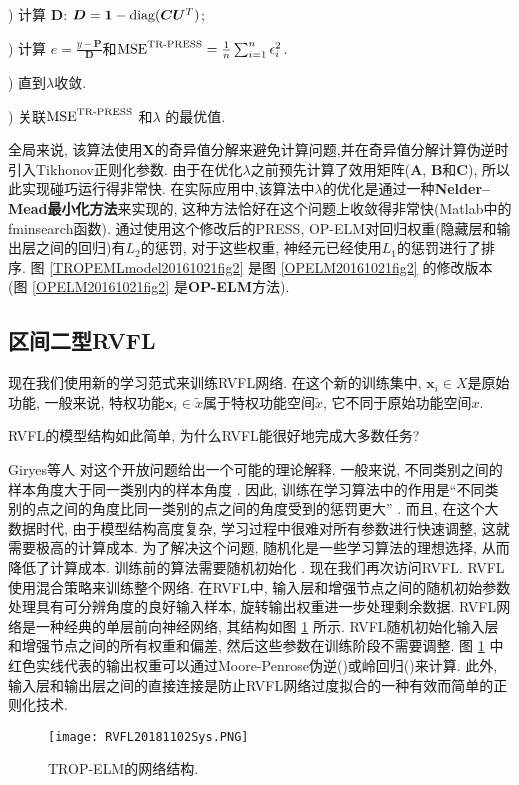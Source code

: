 ) 计算 $\bm D$: $\bm D = \bm 1-\textup{diag}(\bm C\bm U^T)$;

) 计算 $e = \frac{y-\bm P} {\bm D}$和$\textup{MSE}^{\textup{TR-PRESS}}=\frac 1 n \sum_{i=1}^n \epsilon_i^2$.

) 直到$\lambda$收敛.

) 关联$\textup{MSE}^{\textup{TR-PRESS}}$ 和$\lambda$ 的最优值.

全局来说, 该算法使用$\bm X$的奇异值分解来避免计算问题,并在奇异值分解计算伪逆时引入Tikhonov正则化参数.
由于在优化$\lambda$之前预先计算了效用矩阵($\bm A$, $\bm B$和$\bm C$), 所以此实现碰巧运行得非常快.
在实际应用中,该算法中$\lambda$的优化是通过一种\textbf{Nelder–Mead最小化方法}来实现的, 这种方法恰好在这个问题上收敛得非常快(Matlab中的fminsearch函数).
通过使用这个修改后的PRESS, OP-ELM对回归权重(隐藏层和输出层之间的回归)有$L_2$的惩罚, 对于这些权重, 神经元已经使用$L_1$的惩罚进行了排序.
图 \ref{TROPEMLmodel20161021fig2} 是图 \ref{OPELM20161021fig2} 的修改版本 (图 \ref{OPELM20161021fig2} 是\textbf{OP-ELM}方法).
\subsection{区间二型RVFL}
现在我们使用新的学习范式来训练RVFL网络.
在这个新的训练集中, $\bm x_i\in X$是原始功能, 一般来说, 特权功能$\bm x_i\in \widetilde x$属于特权功能空间$\widetilde x$, 它不同于原始功能空间$x$.

RVFL的模型结构如此简单, 为什么RVFL能很好地完成大多数任务?

Giryes等人 \cite{Giryes2016-7439822} 对这个开放问题给出一个可能的理论解释.
一般来说, 不同类别之间的样本角度大于同一类别内的样本角度 \cite{LiorWolf2003}.
因此, 训练在学习算法中的作用是“不同类别的点之间的角度比同一类别的点之间的角度受到的惩罚更大” \cite{Giryes2016-7439822}.
而且, 在这个大数据时代, 由于模型结构高度复杂, 学习过程中很难对所有参数进行快速调整, 这就需要极高的计算成本.
为了解决这个问题, 随机化是一些学习算法的理想选择, 从而降低了计算成本. 训练前的算法需要随机初始化  \cite{Glorot2015, Zhang2015}.
现在我们再次访问RVFL. RVFL使用混合策略来训练整个网络.
在RVFL中, 输入层和增强节点之间的随机初始参数处理具有可分辨角度的良好输入样本, 旋转输出权重进一步处理剩余数据.
RVFL网络是一种经典的单层前向神经网络, 其结构如图 \ref{RVFLNN181102Sys} 所示. RVFL随机初始化输入层和增强节点之间的所有权重和偏差, 然后这些参数在训练阶段不需要调整.
图 \ref{RVFLNN181102Sys} 中红色实线代表的输出权重可以通过Moore-Penrose伪逆(\cite{paopillips1995-6471,IgelnikPao1995-6470})或岭回归(\cite{Bishop2012-6469})来计算.
此外, 输入层和输出层之间的直接连接是防止RVFL网络过度拟合的一种有效而简单的正则化技术.
\begin{figure}[tb]
\centering
  \texttt{[image: RVFL20181102Sys.PNG]}
  \caption{TROP-ELM的网络结构.}
  \label{RVFLNN181102Sys}
\end{figure}

